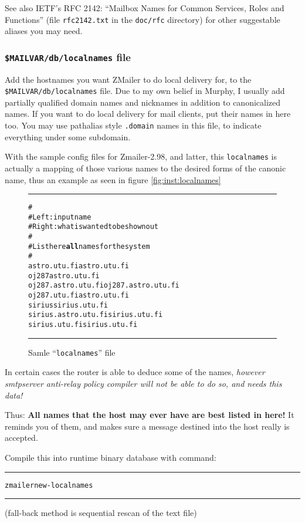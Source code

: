 \begin{multicols}{2}
See also IETF's RFC 2142: ``Mailbox Names for Common Services, Roles and
Functions'' (file {\tt rfc2142.txt} in the {\tt doc/rfc} directory) 
for other suggestable aliases you may need. 


\subsubsection{{\tt \$MAILVAR/db/localnames} file}

%
\label{configure_localnames_file}

Add the hostnames you want ZMailer to do local delivery for, to the
{\tt \$MAILVAR/db/localnames} file.  Due to my own belief in Murphy,
I usually add partially qualified domain names and nicknames in
addition to canonicalized names.  If you want to do local delivery
for mail clients, put their names in here too.  You may use pathalias 
style {\tt.domain} names in this file, to indicate everything under some
subdomain.

With the sample config files for Zmailer-2.98, and latter,
this {\tt localnames} is actually a mapping of those various names to
the desired forms of the canonic name, thus an example as seen
in figure \vref{fig:inst:localnames}

\begin{figure*}
\begin{alltt}\hrule\medskip
#
# Left:  input name
# Right: what is wanted to be shown out
#
# List here {\bf all} names for the system
#
astro.utu.fi         astro.utu.fi
oj287                astro.utu.fi
oj287.astro.utu.fi   oj287.astro.utu.fi
oj287.utu.fi         astro.utu.fi
sirius               sirius.utu.fi
sirius.astro.utu.fi  sirius.utu.fi
sirius.utu.fi        sirius.utu.fi
\medskip\hrule\medskip\end{alltt}
\caption{\label{fig:inst:localnames}Samle ``{\tt localnames}'' file}
\end{figure*}

In certain cases the router is able to deduce some of the names,
{\em however smtpserver anti-relay policy compiler will not be able
 to do so, and needs this data!}

Thus: {\bf All names that the host may ever have are best listed in here!}
It reminds you of them, and makes sure a message destined into the host
really is accepted.

Compile this into runtime binary database with command:
\begin{alltt}\medskip\hrule\medskip
  zmailer new-localnames
\medskip\hrule\medskip\end{alltt}
(fall-back method is sequential rescan of the text file)


\end{multicols}
